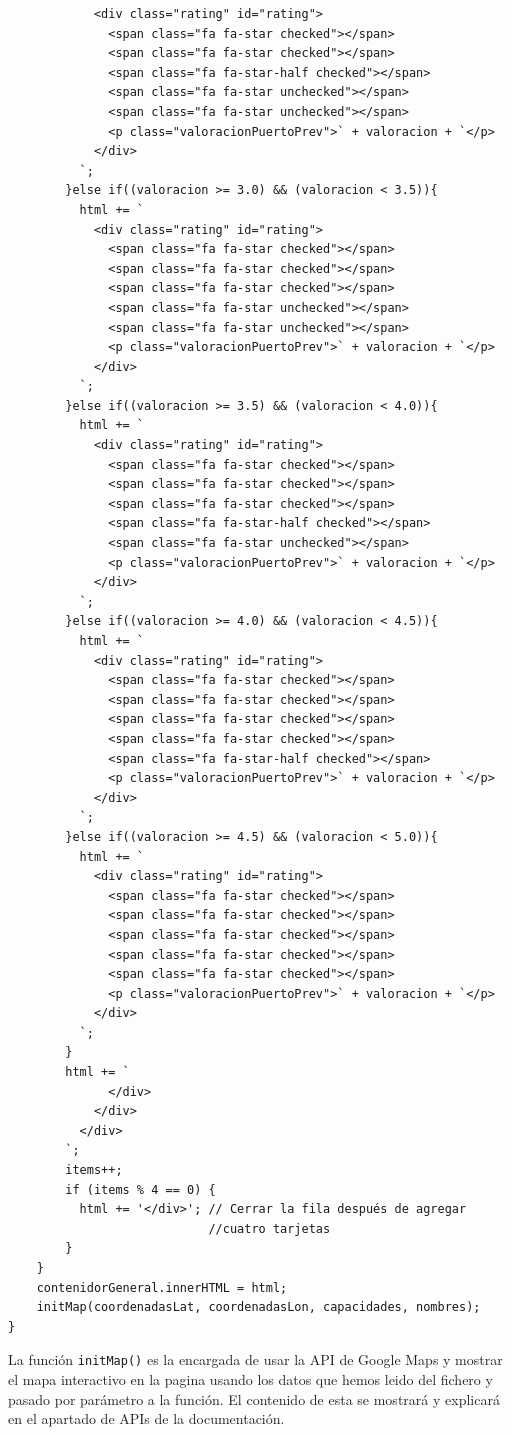 \documentclass{article}
\begin{document}
\begin{itemize}
\begin{verbatim}
            <div class="rating" id="rating">
              <span class="fa fa-star checked"></span>
              <span class="fa fa-star checked"></span>
              <span class="fa fa-star-half checked"></span>
              <span class="fa fa-star unchecked"></span>
              <span class="fa fa-star unchecked"></span>
              <p class="valoracionPuertoPrev">` + valoracion + `</p>
            </div>
          `;
        }else if((valoracion >= 3.0) && (valoracion < 3.5)){
          html += `
            <div class="rating" id="rating">
              <span class="fa fa-star checked"></span>
              <span class="fa fa-star checked"></span>
              <span class="fa fa-star checked"></span>
              <span class="fa fa-star unchecked"></span>
              <span class="fa fa-star unchecked"></span>
              <p class="valoracionPuertoPrev">` + valoracion + `</p>
            </div>
          `;
        }else if((valoracion >= 3.5) && (valoracion < 4.0)){
          html += `
            <div class="rating" id="rating">
              <span class="fa fa-star checked"></span>
              <span class="fa fa-star checked"></span>
              <span class="fa fa-star checked"></span>
              <span class="fa fa-star-half checked"></span>
              <span class="fa fa-star unchecked"></span>
              <p class="valoracionPuertoPrev">` + valoracion + `</p>
            </div>
          `;
        }else if((valoracion >= 4.0) && (valoracion < 4.5)){
          html += `
            <div class="rating" id="rating">
              <span class="fa fa-star checked"></span>
              <span class="fa fa-star checked"></span>
              <span class="fa fa-star checked"></span>
              <span class="fa fa-star checked"></span>
              <span class="fa fa-star-half checked"></span>
              <p class="valoracionPuertoPrev">` + valoracion + `</p>
            </div>
          `;
        }else if((valoracion >= 4.5) && (valoracion < 5.0)){
          html += `
            <div class="rating" id="rating">
              <span class="fa fa-star checked"></span>
              <span class="fa fa-star checked"></span>
              <span class="fa fa-star checked"></span>
              <span class="fa fa-star checked"></span>
              <span class="fa fa-star checked"></span>
              <p class="valoracionPuertoPrev">` + valoracion + `</p>
            </div>
          `;
        }
        html += `
              </div>
            </div>
          </div>
        `;
        items++;
        if (items % 4 == 0) {
          html += '</div>'; // Cerrar la fila después de agregar 
                            //cuatro tarjetas
        }
    }
    contenidorGeneral.innerHTML = html;
    initMap(coordenadasLat, coordenadasLon, capacidades, nombres);
}
    \end{verbatim}
    La función \texttt{initMap()} es la encargada de usar la API de Google Maps y mostrar el mapa interactivo en la pagina usando los datos que hemos leido del fichero y pasado por parámetro a la función. El contenido de esta se mostrará y explicará en el apartado de APIs de la documentación.


\end{itemize}
\end{document}
